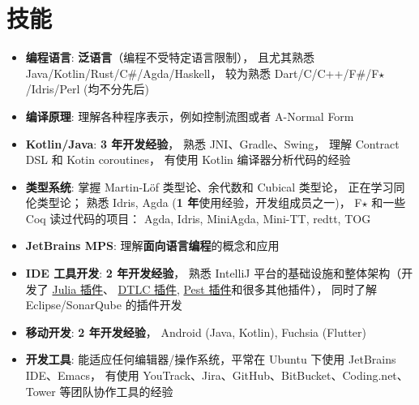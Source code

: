 \documentclass{resume}
\begin{document}
\section{技能}
\begin{itemize}[parsep=0.25ex]
  \item \textbf{编程语言}:
    \textbf{泛语言}（编程不受特定语言限制），
    且尤其熟悉 Java/Kotlin/Rust/C\#/Agda/Haskell，
    较为熟悉 Dart/C/C++/F\#/F$\star$/Idris/Perl (均不分先后)

  \item \textbf{编译原理}:
    理解各种程序表示，例如控制流图或者 A-Normal Form

  \item \textbf{Kotlin/Java}:
    \textbf{3 年开发经验}，
    熟悉 JNI、Gradle、Swing，
    理解 Contract DSL 和 Kotin coroutines，
    有使用 Kotlin 编译器分析代码的经验

  \item \textbf{类型系统}:
    掌握 Martin-L\"{o}f 类型论、余代数和 Cubical 类型论，
    正在学习同伦类型论；
    熟悉 Idris, Agda (\textbf{1 年}使用经验，开发组成员之一)，
    F$\star$ 和一些 Coq
    \subitem 读过代码的项目： Agda, Idris, MiniAgda, Mini-TT, redtt, TOG

  \item \textbf{JetBrains MPS}:
    理解\textbf{面向语言编程}的概念和应用

  \item \textbf{IDE 工具开发}:
    \textbf{2 年开发经验}，
    熟悉 IntelliJ 平台的基础设施和整体架构（开发了
      \href{https://plugins.jetbrains.com/plugin/10413}
           {Julia 插件}、
      \href{https://plugins.jetbrains.com/plugin/12176}
           {DTLC 插件},
      \href{https://plugins.jetbrains.com/plugin/12046}
           {Pest 插件}和很多其他插件），
    同时了解 Eclipse/SonarQube 的插件开发

  \item \textbf{移动开发}:
    \textbf{2 年开发经验}，
    Android (Java, Kotlin), Fuchsia (Flutter)

  \item \textbf{开发工具}:
    能适应任何编辑器/操作系统，平常在 Ubuntu 下使用 JetBrains IDE、Emacs，
    有使用 YouTrack、Jira、GitHub、BitBucket、Coding.net、Tower 等团队协作工具的经验
\end{itemize}
\end{document}
